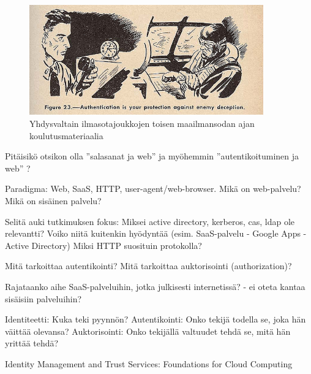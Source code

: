 \documentclass[finnish,gradu]{tktltiki}
\begin{document}
  \begin{figure}
    \centering
    \includegraphics[width=0.9\textwidth]{images/usnavy_authentication.jpg}
    \caption{Yhdysvaltain ilmasotajoukkojen toisen maailmansodan ajan koulutusmateriaalia~\cite{usnavy_authentication}}
    \label{fig:autentikointi_suojaa_viholliselta}
  \end{figure}


  Pitäisikö otsikon olla ''salasanat ja web'' ja myöhemmin ''autentikoituminen ja web'' ?

  Paradigma: Web, SaaS, HTTP, user-agent/web-browser.
  Mikä on web-palvelu?
  Mikä on sisäinen palvelu?

  Selitä auki tutkimuksen fokus:
  Miksei active directory, kerberos, cas, ldap ole relevantti?
  Voiko niitä kuitenkin hyödyntää (esim. SaaS-palvelu - Google Apps - Active Directory)
  Miksi HTTP suosituin protokolla?

  Mitä tarkoittaa autentikointi?
  Mitä tarkoittaa auktorisointi (authorization)?

  Rajataanko aihe SaaS-palveluihin, jotka julkisesti internetissä?
  - ei oteta kantaa sisäisiin palveluihin?

  Identiteetti: Kuka teki pyynnön?
  Autentikointi: Onko tekijä todella se, joka hän väittää olevansa?
  Auktorisointi: Onko tekijällä valtuudet tehdä se, mitä hän yrittää tehdä?

  Identity Management and Trust Services: Foundations for Cloud Computing
\end{document}
